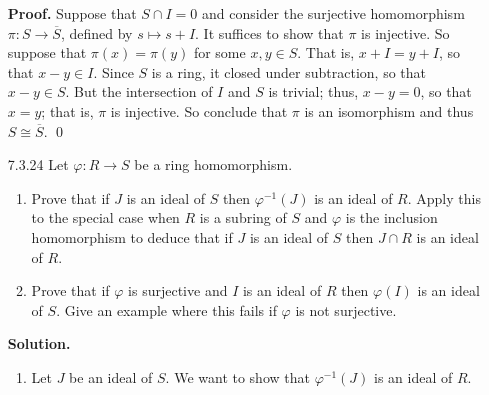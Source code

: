 \begin{enumerate}
      \textbf{Proof.} Suppose that $S \cap I = 0$ and consider the surjective 
      homomorphism
      $\pi : S \rightarrow \overline{S}$, defined by $s \mapsto s + I$. It
      suffices to show that $\pi$ is injective. So suppose that
      $\pi(x) = \pi(y)$ for some $x, y \in S$. That is, $x + I = y + I$, so that
      $x - y \in I$. Since $S$ is a ring, it closed under subtraction, so that
      $x - y \in S$. But the intersection of $I$ and $S$ is trivial; thus,
      $x - y = 0$, so that $x = y$; that is, $\pi$ is injective. So conclude
      that $\pi$ is an isomorphism and thus $S \cong \overline{S}$. \qed
   \item[7.3.24]  Let $\varphi : R \rightarrow S$ be a ring homomorphism.
                  \begin{enumerate}
                     \item Prove that if $J$ is an ideal of $S$ then
                           $\varphi^{-1}(J)$ is an ideal of $R$. Apply this to
                           the special case when $R$ is a subring of $S$ and
                           $\varphi$ is the inclusion homomorphism to deduce
                           that if $J$ is an ideal of $S$ then $J \cap R$ is an
                           ideal of $R$.
                     \item Prove that if $\varphi$ is surjective and $I$ is an
                           ideal of $R$ then $\varphi(I)$ is an ideal of $S$.
                           Give an example where this fails if $\varphi$ is not
                           surjective.
                  \end{enumerate}

      \textbf{Solution.}

      \begin{enumerate}
         \item Let $J$ be an ideal of $S$. We want to show that
               $\varphi^{-1}(J)$ is an ideal of $R$.


\end{enumerate}
\end{enumerate}
